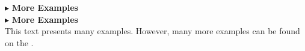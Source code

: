 \documentclass{ximera}
\begin{document}
\textbf{\textcolor{red!80!black}{$\blacktriangleright$}} \textbf{\textcolor{blue!75!black}{More Examples}} \\

\textbf{\textcolor{blue!75!black}{$\blacktriangleright$}} \textbf{\textcolor{red!80!black}{More Examples}} \\



This text presents many examples.  However, many more examples can be found on the .
\end{document}
